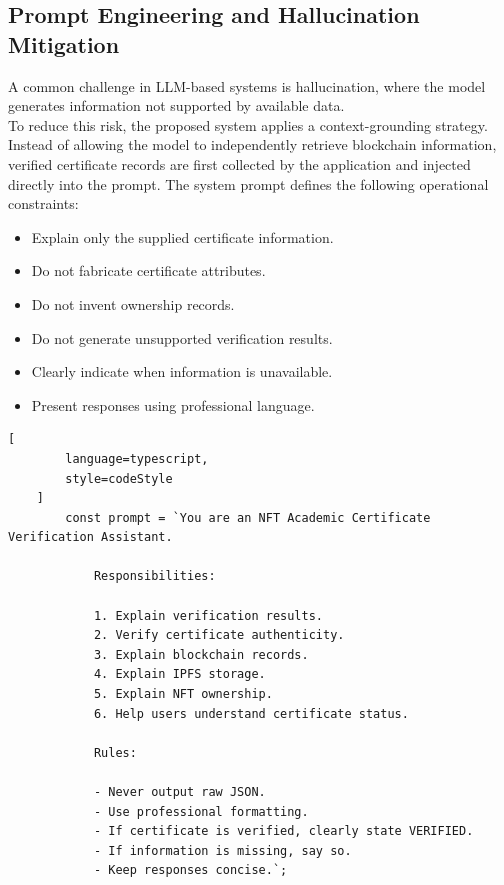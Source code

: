 \subsection{Prompt Engineering and Hallucination Mitigation}

A common challenge in LLM-based systems is hallucination, where the model generates information not supported by available data.\\

To reduce this risk, the proposed system applies a context-grounding strategy. Instead of allowing the model to independently retrieve blockchain information, verified certificate records are first collected by the application and injected directly into the prompt. The system prompt defines the following operational constraints:

\begin{itemize}
    \item Explain only the supplied certificate information.

    \item Do not fabricate certificate attributes.

    \item Do not invent ownership records.

    \item Do not generate unsupported verification results.

    \item Clearly indicate when information is unavailable.

    \item Present responses using professional language.
\end{itemize}

\begin{lstlisting}[
        language=typescript,
        style=codeStyle
    ]
        const prompt = `You are an NFT Academic Certificate Verification Assistant.

            Responsibilities:

            1. Explain verification results.
            2. Verify certificate authenticity.
            3. Explain blockchain records.
            4. Explain IPFS storage.
            5. Explain NFT ownership.
            6. Help users understand certificate status.

            Rules:

            - Never output raw JSON.
            - Use professional formatting.
            - If certificate is verified, clearly state VERIFIED.
            - If information is missing, say so.
            - Keep responses concise.`;
    \end{lstlisting}

